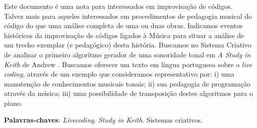 \setlength{\absparsep}{18pt} %
\begin{resumo}

Este documento é uma nota para interessados em improvisação de códigos. Talvez mais para aqueles interessados em procedimentos de pedagogia musical do código do que uma análise completa de uma ou duas obras. Indicamos eventos históricos da improvisação de códigos ligados à Música para situar a análise de um trecho exemplar (e pedagógico) desta história. Buscamos no Sistema Criativo de  analisar o primeiro algoritmo gerador de uma sonoridade tonal em \emph{A Study in Keith} de Andrew . Buscamos oferecer um texto em língua portuguesa sobre o \emph{live coding}, através de um exemplo que consideramos representativo por: i) uma manutenção de conhecimentos musicais tonais; ii) sua pedagogia de programação através da música; iii) uma possibilidade de transposição destes algoritmos para o piano.

\vspace{\onelineskip}
\noindent
\textbf{Palavras-chaves}: \textit{Livecoding}. \emph{Study in Keith}. Sistemas criativos.
\end{resumo}

\begin{comment}
\begin{resumo}[Abstract]
 \begin{otherlanguage*}{english}

   \vspace{\onelineskip}
 
   \noindent 
   \textbf{Key-words}: latex. abntex. text editoration.
 \end{otherlanguage*}
\end{resumo}

\begin{comment}

\begin{resumo}[Résumé]
 \begi'n{otherlanguage*}{french}
    Il s'agit d'un résumé en français.
 
   \textbf{Mots-clés}: latex. abntex. publication de textes.
 \end{otherlanguage*}
\end{resumo}

\begin{resumo}[Resumen]
 \begin{otherlanguage*}{spanish}
   Este es el resumen en español.
  
   \textbf{Palabras clave}: latex. abntex. publicación de textos.
 \end{otherlanguage*}
\end{resumo}
\end{comment}